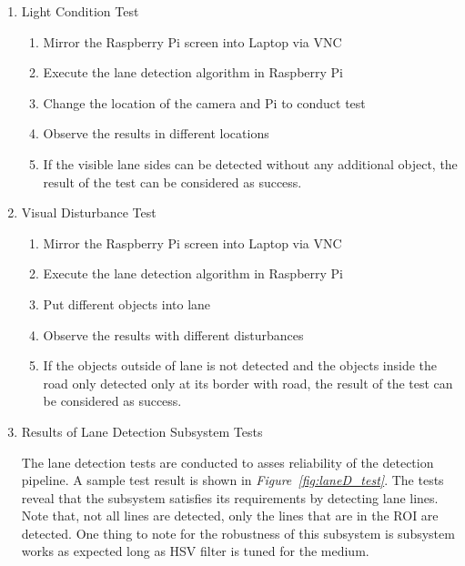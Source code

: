 \documentclass[a4paper,12pt]{article}
\begin{document}
\begin{enumerate}

\item{Light Condition Test}

\begin{enumerate}

\item Mirror the Raspberry Pi screen into Laptop via VNC  

\item Execute the lane detection algorithm in Raspberry Pi 

\item Change the location of the camera and Pi to conduct test 

\item Observe the results in different locations   

\item If the visible lane sides can be detected without any additional object, the result of the test can be considered as success. 

\end{enumerate}

\item{Visual Disturbance Test}

\begin{enumerate}

\item Mirror the Raspberry Pi screen into Laptop via VNC   

\item Execute the lane detection algorithm in Raspberry Pi  

\item Put different objects into lane  

\item Observe the results with different disturbances 

\item If the objects outside of lane is not detected and the objects inside the road only detected only at its border with road, the result of the test can be considered as success.  

\end{enumerate}




\item{Results of Lane Detection Subsystem Tests}

	The lane detection tests are conducted to asses reliability of the detection pipeline. A sample test result is shown in \textit{Figure~\ref{fig:laneD_test}}. The tests reveal that the subsystem satisfies its requirements by detecting lane lines. Note that, not all lines are detected, only the lines that are in the ROI are detected. One thing to note for the robustness of this subsystem is subsystem works as expected long as HSV filter is tuned for the medium.
\end{enumerate}
\end{document}
